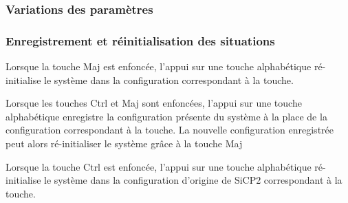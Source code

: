 \subsubsection{Variations des paramètres}
%
%
\subsubsection{Enregistrement et réinitialisation des situations}
%

Lorsque la touche {\sf Maj} est enfoncée, l'appui sur une touche alphabétique ré-initialise le système dans la configuration correspondant à la touche.

Lorsque les touches {\sf Ctrl} et {\sf Maj} sont enfoncées, l'appui sur une touche alphabétique enregistre la configuration présente du système à la place de la configuration correspondant à la touche. La nouvelle configuration enregistrée peut alors ré-initialiser le système grâce à la touche {\sf Maj}

Lorsque la touche {\sf Ctrl} est enfoncée, l'appui sur une touche alphabétique ré-initialise le système dans la configuration d'origine de SiCP2 correspondant à la touche.

%
